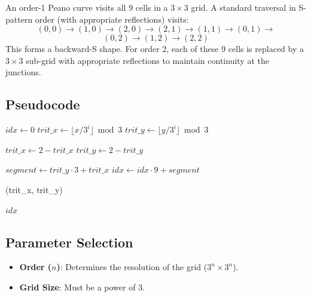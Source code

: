 \begin{example}\label{ex:peano_order1}
An order-1 Peano curve visits all $9$ cells in a $3 \times 3$ grid. A standard traversal in S-pattern order (with appropriate reflections) visits:
\[
(0,0) \to (1,0) \to (2,0) \to (2,1) \to (1,1) \to (0,1) \to
\]
\[
(0,2) \to (1,2) \to (2,2)
\]
This forms a backward-S shape. For order 2, each of these 9 cells is replaced by a $3 \times 3$ sub-grid with appropriate reflections to maintain continuity at the junctions.
\end{example}

\subsection{Pseudocode}
\begin{algorithm}
\caption{Peano Curve: Coordinates to Index}\label{alg:peano_index}
\begin{algorithmic}
    \State $idx \gets 0$
        \State $trit\_x \gets \lfloor x / 3^i \rfloor \bmod 3$
        \State $trit\_y \gets \lfloor y / 3^i \rfloor \bmod 3$

            \State $trit\_x \gets 2 - trit\_x$
        \EndIf
            \State $trit\_y \gets 2 - trit\_y$
        \EndIf

        \State $segment \gets trit\_y \cdot 3 + trit\_x$
        \State $idx \gets idx \cdot 9 + segment$

        \State {}(trit\_x, trit\_y)
    \EndFor

    \Return $idx$
\EndFunction
\end{algorithmic}
\end{algorithm}

\subsection{Parameter Selection}
\begin{itemize}
    \item \textbf{Order ($n$)}: Determines the resolution of the grid ($3^n \times 3^n$).
    \item \textbf{Grid Size}: Must be a power of 3.
\end{itemize}

